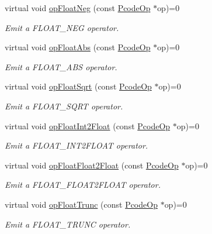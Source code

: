 \begin{DoxyCompactItemize}
virtual void \mbox{\hyperlink{class_print_language_ae56bbe89c7352d7ff664c8eced363a16}{op\+Float\+Neg}} (const \mbox{\hyperlink{class_pcode_op}{Pcode\+Op}} $\ast$op)=0
\begin{DoxyCompactList}\small\item\em Emit a F\+L\+O\+A\+T\+\_\+\+N\+EG operator. \end{DoxyCompactList}\item 
virtual void \mbox{\hyperlink{class_print_language_a01ada804030f8515265a841bec6b25d6}{op\+Float\+Abs}} (const \mbox{\hyperlink{class_pcode_op}{Pcode\+Op}} $\ast$op)=0
\begin{DoxyCompactList}\small\item\em Emit a F\+L\+O\+A\+T\+\_\+\+A\+BS operator. \end{DoxyCompactList}\item 
virtual void \mbox{\hyperlink{class_print_language_ad144b5d7a2a98298b166b924881d38ca}{op\+Float\+Sqrt}} (const \mbox{\hyperlink{class_pcode_op}{Pcode\+Op}} $\ast$op)=0
\begin{DoxyCompactList}\small\item\em Emit a F\+L\+O\+A\+T\+\_\+\+S\+Q\+RT operator. \end{DoxyCompactList}\item 
virtual void \mbox{\hyperlink{class_print_language_aae2e1fb650183391f86ea87a910c9862}{op\+Float\+Int2\+Float}} (const \mbox{\hyperlink{class_pcode_op}{Pcode\+Op}} $\ast$op)=0
\begin{DoxyCompactList}\small\item\em Emit a F\+L\+O\+A\+T\+\_\+\+I\+N\+T2\+F\+L\+O\+AT operator. \end{DoxyCompactList}\item 
virtual void \mbox{\hyperlink{class_print_language_a1ec6425a6c6d6313f571289c95292d22}{op\+Float\+Float2\+Float}} (const \mbox{\hyperlink{class_pcode_op}{Pcode\+Op}} $\ast$op)=0
\begin{DoxyCompactList}\small\item\em Emit a F\+L\+O\+A\+T\+\_\+\+F\+L\+O\+A\+T2\+F\+L\+O\+AT operator. \end{DoxyCompactList}\item 
virtual void \mbox{\hyperlink{class_print_language_a13a25f26678ca8199d44d56ebfccead6}{op\+Float\+Trunc}} (const \mbox{\hyperlink{class_pcode_op}{Pcode\+Op}} $\ast$op)=0
\begin{DoxyCompactList}\small\item\em Emit a F\+L\+O\+A\+T\+\_\+\+T\+R\+U\+NC operator. \end{DoxyCompactList}\item 

\end{DoxyCompactItemize}
